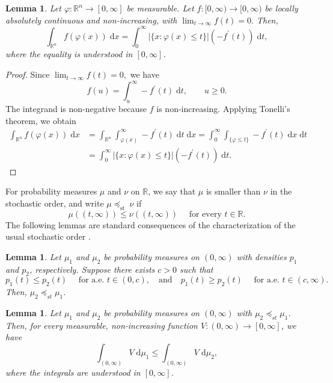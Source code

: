 \documentclass[11pt]{amsart}
\theoremstyle{plain}
\newtheorem{lemma}[theorem]{Lemma}
\theoremstyle{definition}
\theoremstyle{remark}
\begin{document}
\begin{lemma} \label{lem:sublevel-set-representation}
    Let $\varphi: \mathbb{R}^n \rightarrow[0, \infty]$ be measurable. Let $f:[0, \infty) \rightarrow[0, \infty)$ be locally absolutely continuous and non-increasing, with
    $
    \displaystyle \lim_{t \rightarrow \infty} f(t)=0 .
    $
    Then,
    $$
    \int_{\mathbb{R}^n} f(\varphi(x)) \;\mathrm d x=\int_0^{\infty}|\{x: \varphi(x) \leq t\}|\left(-f^{\prime}(t)\right) \;\mathrm d t,
    $$
    where the equality is understood in $[0, \infty]$.
\end{lemma}
\begin{proof}
    Since $\displaystyle \lim_{t \rightarrow \infty} f(t)=0 ,$ we have
    $$
    f(u)=\int_u^{\infty}-f^{\prime}(t) \;\mathrm d t, \qquad u \geq 0.
    $$
    The integrand is non-negative because $f$ is non-increasing. Applying Tonelli's theorem, we obtain
    \begin{align}
        \int_{\mathbb{R}^n} f(\varphi(x)) \;\mathrm d x
         &=\int_{\mathbb{R}^n} \int_{\varphi(x)}^{\infty} -f^{\prime}(t)\;\mathrm d t \;\mathrm d x
         =\int_0^{\infty} \int_{\{\varphi \leq t\}} -f^{\prime}(t) \;\mathrm d x \;\mathrm d t
         \\
         &=\int_0^{\infty}|\{x: \varphi(x) \leq t\}|\left(-f^{\prime}(t)\right) \;\mathrm d t .
    \end{align}
\end{proof}
For probability measures $\mu$ and $\nu$ on $\mathbb R$, we say that $\mu$ is smaller than $\nu$ in the stochastic order, and write $\mu \preceq_{\text {st }} \nu$
if
\[
\mu((t, \infty)) \leq \nu((t, \infty)) \quad \text { for every } t \in \mathbb{R} .
\]
The following lemmas are standard consequences of the characterization of the usual stochastic order \cite[Section 1.A.1]{SS-07}.
\begin{lemma} \label{lem:measures-comparison}
    Let $\mu_1$ and $\mu_2$ be probability measures on $(0, \infty)$ with densities $p_1$ and $p_2$, respectively. Suppose there exists $c>0$ such that
    $$
    p_1(t) \leq p_2(t) \quad \text { for a.e. } t \in(0, c),
    \quad \text{and} \quad
    p_1(t) \geq p_2(t) \quad \text { for a.e. } t \in(c, \infty) .
    $$
    Then, $\mu_2 \preceq_{st} \mu_1$.
\end{lemma}

\begin{lemma} \label{lem:measures-comparison-non-increasing}
    Let $\mu_1$ and $\mu_2$ be probability measures on $(0,\infty)$ with $\mu_2 \preceq_{st} \mu_1$. Then, for every measurable, non-increasing function $V:(0, \infty) \rightarrow[0, \infty]$, we have
    \begin{equation}
    \int_{(0, \infty)} V \;\mathrm d \mu_1 \leq \int_{(0, \infty)} V \;\mathrm d \mu_2,
    \end{equation}
    where the integrals are understood in $[0, \infty]$.
\end{lemma}
\end{document}
